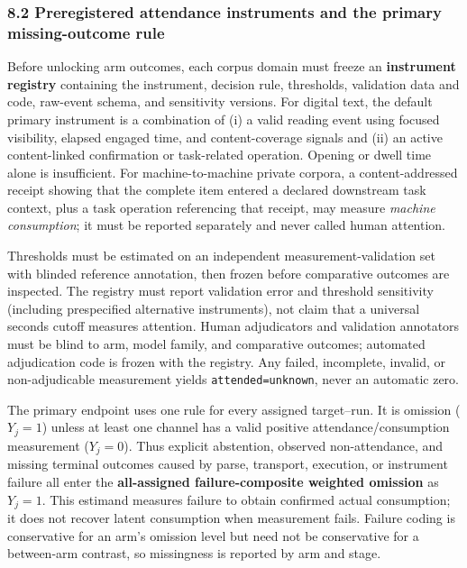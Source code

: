 \documentclass[
  11pt]{article}
\begin{document}
\subsubsection{8.2 Preregistered attendance instruments and the primary
missing-outcome
rule}\label{preregistered-attendance-instruments-and-the-primary-missing-outcome-rule}

Before unlocking arm outcomes, each corpus domain must freeze an
\textbf{instrument registry} containing the instrument, decision rule,
thresholds, validation data and code, raw-event schema, and sensitivity
versions. For digital text, the default primary instrument is a
combination of (i) a valid reading event using focused visibility,
elapsed engaged time, and content-coverage signals and (ii) an active
content-linked confirmation or task-related operation. Opening or dwell
time alone is insufficient. For machine-to-machine private corpora, a
content-addressed receipt showing that the complete item entered a
declared downstream task context, plus a task operation referencing that
receipt, may measure \emph{machine consumption}; it must be reported
separately and never called human attention.

Thresholds must be estimated on an independent measurement-validation
set with blinded reference annotation, then frozen before comparative
outcomes are inspected. The registry must report validation error and
threshold sensitivity (including prespecified alternative instruments),
not claim that a universal seconds cutoff measures attention. Human
adjudicators and validation annotators must be blind to arm, model
family, and comparative outcomes; automated adjudication code is frozen
with the registry. Any failed, incomplete, invalid, or non-adjudicable
measurement yields \texttt{attended=unknown}, never an automatic zero.

The primary endpoint uses one rule for every assigned target--run. It is
omission (\(Y_j=1\)) unless at least one channel has a valid positive
attendance/consumption measurement (\(Y_j=0\)). Thus explicit
abstention, observed non-attendance, and missing terminal outcomes
caused by parse, transport, execution, or instrument failure all enter
the \textbf{all-assigned failure-composite weighted omission} as
\(Y_j=1\). This estimand measures failure to obtain confirmed actual
consumption; it does not recover latent consumption when measurement
fails. Failure coding is conservative for an arm's omission level but
need not be conservative for a between-arm contrast, so missingness is
reported by arm and stage.
\end{document}
